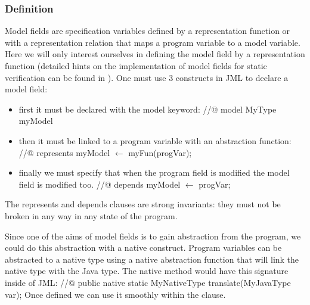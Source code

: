 \subsubsection{Definition}
Model fields are specification variables defined by a representation function or with a 
representation relation that maps a program variable to a model variable. Here we will 
only interest ourselves in defining the model field by a representation function (detailed
hints on the implementation of model fields for static verification can be found in
 \cite{LeinoMueller06,breunesse03verifying}). One must 
use 3 constructs in JML to declare a model field:
\begin{itemize}
\item first it must be declared with the model keyword: 
\btab 
//@ model MyType myModel
\etab
\item then it must be linked to a program variable with an abstraction function:
\btab
//@ represents myModel $\leftarrow$ myFun(progVar);
\etab
\item finally we must specify that when the program field is modified the model field is modified too.
\btab
//@ depends myModel $\leftarrow$ progVar;
\etab
\end{itemize}
The represents and depends clauses are strong invariants: they must not be broken 
in any way in any state of the program.

Since one of the aims of model fields is to gain abstraction from the program, 
we could do this abstraction with a native construct. Program variables can be 
abstracted to a native type using a native abstraction function that will link
 the native type with the Java type. The native method would have this signature inside of JML:
\btab
//@ public native static MyNativeType translate(MyJavaType var);
\etab
Once defined we can use it smoothly within the  clause.

